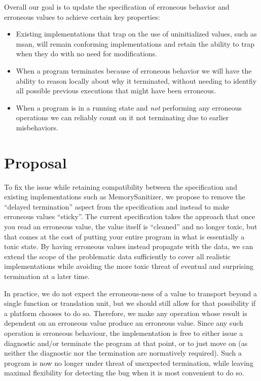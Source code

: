 Overall our goal is to update the specification of erroneous behavior and erroneous values to achieve certain key properties:
\begin{itemize}
\item Existing implementations that trap on the use of uninitialized values, such as msan, will remain conforming implementations and retain the ability to trap when they do with no need for modifications.
\item When a program terminates because of erroneous behavior we will have the ability to reason locally about why it terminated, without needing to identfiy all possible previous executions that might have been erroneous.
\item When a program is in a running state and \emph{not} performing any erroneous operations we can reliably count on it not terminating due to earlier misbehaviors.
\end{itemize}

\section{Proposal}

To fix the issue while retaining compatibility between the specification and existing implementations such as MemorySanitizer, we propose to remove the ``delayed termination'' aspect from the specification and instead to make erroneous values ``sticky''.  The current specification takes the approach that once you read an erroneous value, the value itself is ``cleaned'' and no longer toxic, but that comes at the cost of putting your entire program in what is essentially a toxic state. By having erroneous values instead propagate with the data, we can extend the scope of the problematic data sufficiently to cover all realistic implementations while avoiding the more toxic threat of eventual and surprising termination at a later time.

In practice, we do not expect the erroneous-ness of a value to transport beyond a single function or translation unit, but we should still allow for that possibility if a platform chooses to do so.   Therefore, we make any operation whose result is dependent on an erroneous value produce an erroneous value. Since any such operation is erroneous behaviour, the implementation is free to either issue a diagnostic and/or terminate the program at that point, or to just move on (as neither the diagnostic nor the termination are normatively required). Such a program is now no longer under threat of unexpected termination, while leaving maximal flexibility for detecting the bug when it is most convenient to do so.

